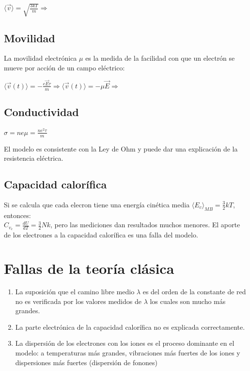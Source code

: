 \documentclass[oneside]{book}
\numberwithin{equation}{section}
\numberwithin{figure}{section}
\numberwithin{table}{section}
\begin{document}
				\begin{center}
					$\displaystyle \langle \vec{v} \rangle =\sqrt{\frac{3 k T}{m}} \Rightarrow$ 
				\end{center}
			
			\subsection{Movilidad}
			
				La movilidad electrónica $\mu$ es la medida de la facilidad con que un electrón se mueve por acción de un campo eléctrico:
				
				\begin{center}
					$\displaystyle \langle \vec{v}(t) \rangle=-\frac{e\vec{E}\tau}{m} \Rightarrow \langle \vec{v}(t) \rangle=-\mu \vec{E} \Rightarrow $ 
				\end{center}
						
			\subsection{Conductividad}
			
			\begin{center}
				$\displaystyle \sigma=n e \mu=\frac{n e^2 \tau}{m}$
			\end{center}
			
			El modelo es consistente con la Ley de Ohm y puede dar una explicación de la resistencia eléctrica.\\
			
			\subsection{Capacidad calorífica}

				Si se calcula que cada elecron tiene una energía cinética media $\langle E_c \rangle_{MB}=\frac{3}{2}kT$, entonces:\\
				 $C_{v_e}=\frac{d U}{dT}=\frac{3}{2}Nk$, pero las mediciones dan resultados muchos menores. El aporte de los electrones a la capacidad calorífica es una falla del modelo.
			
		\section{Fallas de la teoría clásica}	
		
			\begin{enumerate}
				\item La suposición que el camino libre medio $\lambda$ es del orden de la constante de red no es verificada por los valores medidos de $\lambda$ los cuales son mucho más grandes.
				\item La parte electrónica de la capacidad calorífica no es explicada correctamente.
				\item La dispersión de los electrones con los iones es el proceso dominante en el modelo: a temperaturas más grandes, vibraciones más fuertes de los iones y dispersiones más fuertes (dispersión de fonones)
			\end{enumerate}					
			
\end{document}
